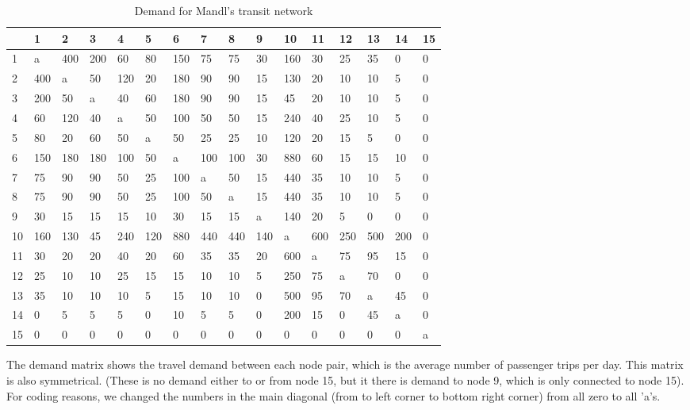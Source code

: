 \begin{table}[H]
\label{tbl:mandlDemand}
\resizebox{12.5cm}{!} {
 

    \begin{tabular}{|l|lllllllllllllll|}
    \hline
    ~ & 1       & 2        &  3    &   4     &  5     &  6      & 7      &  8     & 9      & 10      & 11     & 12         &  13     & 14       &  15  \\
    \hline
    1 & a   & 400 & 200 & 60  & 80  & 150 & 75  & 75  & 30  & 160 & 30  & 25  & 35  & 0   & 0 \\
    2 & 400 & a   & 50  & 120 & 20  & 180 & 90  & 90  & 15  & 130 & 20  & 10  & 10  & 5   & 0 \\
    3 & 200 & 50  & a   & 40  & 60  & 180 & 90  & 90  & 15  & 45  & 20  & 10  & 10  & 5   & 0 \\
    4 & 60  & 120 & 40  & a   & 50  & 100 & 50  & 50  & 15  & 240 & 40  & 25  & 10  & 5   & 0 \\
    5 & 80  & 20  & 60  & 50  & a   & 50  & 25  & 25  & 10  & 120 & 20  & 15  & 5   & 0   & 0 \\
    6 & 150 & 180 & 180 & 100 & 50  & a   & 100 & 100 & 30  & 880 & 60  & 15  & 15  & 10  & 0 \\
    7 & 75  & 90  & 90  & 50  & 25  & 100 & a   & 50  & 15  & 440 & 35  & 10  & 10  & 5   & 0 \\
    8 & 75  & 90  & 90  & 50  & 25  & 100 & 50  & a   & 15  & 440 & 35  & 10  & 10  & 5   & 0 \\
    9 & 30  & 15  & 15  & 15  & 10  & 30  & 15  & 15  & a   & 140 & 20  & 5   & 0   & 0   & 0 \\
    10 & 160 & 130 & 45  & 240 & 120 & 880 & 440 & 440 & 140 & a   & 600 & 250 & 500 & 200 & 0 \\
    11 & 30  & 20  & 20  & 40  & 20  & 60  & 35  & 35  & 20  & 600 & a   & 75  & 95  & 15  & 0 \\
    12 & 25  & 10  & 10  & 25  & 15  & 15  & 10  & 10  & 5   & 250 & 75  & a   & 70  & 0   & 0 \\
    13 & 35  & 10  & 10  & 10  & 5   & 15  & 10  & 10  & 0   & 500 & 95  & 70  & a   & 45  & 0 \\
    14 & 0   & 5   & 5   & 5   & 0   & 10  & 5   & 5   & 0   & 200 & 15  & 0   & 45  & a   & 0 \\
    15 & 0   & 0   & 0   & 0   & 0   & 0   & 0   & 0   & 0   & 0   & 0   & 0   & 0   & 0   & a \\ 
    \hline
    \end{tabular}
    }
 	\caption {Demand for Mandl's transit network}
 	\label{table:MandlDemand}
 	The demand matrix shows the travel demand between each node pair, which is the average number of passenger trips per day. This matrix is also symmetrical. (These is no demand either to or from node 15, but it there is demand to node 9, which is only connected to node 15). For coding reasons, we changed the numbers in the main diagonal (from to left corner to bottom right corner) from all zero to all ’a’s.

\end{table}

